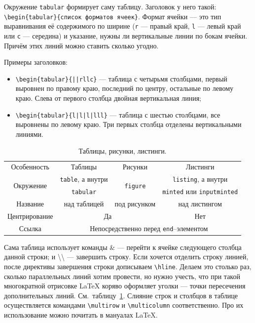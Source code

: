 \documentclass[14pt, russian]{scrartcl}
\begin{document}
Окружение \texttt{tabular} формирует саму таблицу. Заголовок у него такой: \texttt{\textbackslash begin\{tabular\}\{список форматов ячеек\}}. Формат ячейки --- это тип выравнивания её содержимого по ширине (\texttt{r} --- правый край, \texttt{l} --- левый край или \texttt{c} --- середина) и указание, нужны ли вертикальные линии по бокам ячейки. Причём этих линий можно ставить сколько угодно.

Примеры заголовков:
\begin{itemize}
\item \texttt{\textbackslash begin\{tabular\}\{||rllc\}} --- таблица с четырьмя столбцами, первый выровнен по правому краю, последний по центру, остальные по левому краю. Слева от первого столбца двойная вертикальная линия;
\item \texttt{\textbackslash begin\{tabular\}\{l|l|l|lll\}} --- таблица с шестью столбцами, все выровнены по левому краю. Три первых столбца отделены вертикальными линиями.
\end{itemize}

\bigskip

\begin{table}[htb]
\caption{\centering Таблицы, рисунки, листинги.}
\small
\centering\begin{tabular}{|||c|c|c|c||}
\hline\hline
\multirow{ 2}{*}{Особенность} & \multirow{ 2}{*}{Таблицы} & \multirow{ 2}{*}{Рисунки} & \multirow{ 2}{*}{Листинги}\\
& & & \\
\hline
\multirow{ 2}{*}{Окружение} & {\texttt{table}, а внутри}  & \multirow{ 2}{*}{\texttt{figure}} & \texttt{listing}, а внутри \\
&\texttt{tabular} & & \texttt{minted} или \texttt{inputminted}\\\hline
\multirow{ 2}{*}{Название} & \multirow{ 2}{*}{над таблицей}  & \multirow{ 2}{*}{под рисунком}  & \multirow{ 2}{*}{над листингом}\\
&  &  &  \\
\hline
Центрирование &\multicolumn{2}{c|}{Да} & Нет \\\hline
\multirow{2}{*}{Ссылка} &\multicolumn{3}{c||}{\multirow{2}{*}{Непосредственно перед \texttt{end}--элементом}} \\
&\multicolumn{3}{c||}{} \\
\hline\hline
\end{tabular}
\label{table:table}
\end{table}

Сама таблица использует команды \&{} --- перейти к ячейке следующего столбца данной строки; и \textbackslash\textbackslash{} --- завершить строку. Если хочется отделить строку линией, после директивы завершения строки дописываем \texttt{\textbackslash hline}. Делаем это столько раз, сколько параллельных линий хотим провести, но нужно учесть, что при такой многократной отрисовке \LaTeX{} коряво оформляет уголки --- точки пересечения дополнительных линий. См.~таблицу~\ref{table:table}. Слияние строк и столбцов в таблице осуществляется командами \texttt{\textbackslash multirow} и \texttt{\textbackslash multicolumn} соответственно. Про их использование можно почитать в мануалах \LaTeX.
\end{document}
